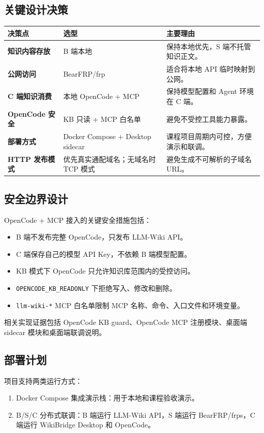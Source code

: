 \documentclass[UTF8,a4paper,12pt,fontset=fandol]{ctexart}
\newcommand{\code}[1]{\begingroup\urlstyle{tt}\footnotesize\nolinkurl{#1}\endgroup}
\begin{document}
\subsection{关键设计决策}
\begin{longtable}{>{\bfseries}p{3.2cm}p{4.2cm}p{6.8cm}}
\toprule
决策点 & 选型 & 主要理由 \\
\midrule
知识内容存放 & B 端本地 & 保持本地优先，S 端不托管知识正文。 \\
公网访问 & BearFRP/frp & 适合将本地 API 临时映射到公网。 \\
C 端知识消费 & 本地 OpenCode + MCP & 保持模型配置和 Agent 环境在 C 端。 \\
OpenCode 安全 & KB 只读 + MCP 白名单 & 避免不受控工具能力暴露。 \\
部署方式 & Docker Compose + Desktop sidecar & 课程项目周期内可控，方便演示和联调。 \\
HTTP 发布模式 & 优先真实通配域名；无域名时 TCP 模式 & 避免生成不可解析的子域名 URL。 \\
\bottomrule
\end{longtable}

\subsection{安全边界设计}
OpenCode + MCP 接入的关键安全措施包括：
\begin{itemize}
  \item B 端不发布完整 OpenCode，只发布 LLM-Wiki API。
  \item C 端保存自己的模型 API Key，不依赖 B 端模型配置。
  \item KB 模式下 OpenCode 只允许知识库范围内的受控访问。
  \item \code{OPENCODE_KB_READONLY} 下拒绝写入、修改和删除。
  \item \code{llm-wiki-*} MCP 白名单限制 MCP 名称、命令、入口文件和环境变量。
\end{itemize}

相关实现证据包括 OpenCode KB guard、OpenCode MCP 注册模块、桌面端 sidecar 模块和桌面端联调说明。

\subsection{部署计划}
项目支持两类运行方式：
\begin{enumerate}
  \item Docker Compose 集成演示栈：用于本地和课程验收演示。
  \item B/S/C 分布式联调：B 端运行 LLM-Wiki API，S 端运行 BearFRP/frps，C 端运行 WikiBridge Desktop 和 OpenCode。
\end{enumerate}
\end{document}
